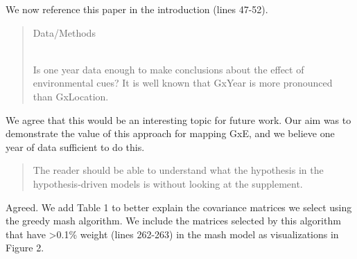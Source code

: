 \documentclass[
  letterpaper,
  DIV=11,
  numbers=noendperiod]{scrartcl}
\begin{document}
We now reference this paper in the introduction (lines 47-52).

\begin{quote}
\begin{tcolorbox}[enhanced jigsaw, colframe=quarto-callout-warning-color-frame, rightrule=.15mm, leftrule=.75mm, left=2mm, breakable, toprule=.15mm, arc=.35mm, bottomrule=.15mm, opacityback=0, colback=white]

Data/Methods\\
\strut \\
Is one year data enough to make conclusions about the effect of
environmental cues? It is well known that GxYear is more pronounced than
GxLocation.

\end{tcolorbox}
\end{quote}

We agree that this would be an interesting topic for future work. Our
aim was to demonstrate the value of this approach for mapping GxE, and
we believe one year of data sufficient to do this.

\begin{quote}
\begin{tcolorbox}[enhanced jigsaw, colframe=quarto-callout-warning-color-frame, rightrule=.15mm, leftrule=.75mm, left=2mm, breakable, toprule=.15mm, arc=.35mm, bottomrule=.15mm, opacityback=0, colback=white]

The reader should be able to understand what the hypothesis in the
hypothesis-driven models is without looking at the supplement.

\end{tcolorbox}
\end{quote}

Agreed. We add Table 1 to better explain the covariance matrices we
select using the greedy mash algorithm. We include the matrices selected
by this algorithm that have \textgreater0.1\% weight (lines 262-263) in
the mash model as visualizations in Figure 2.
\end{document}
